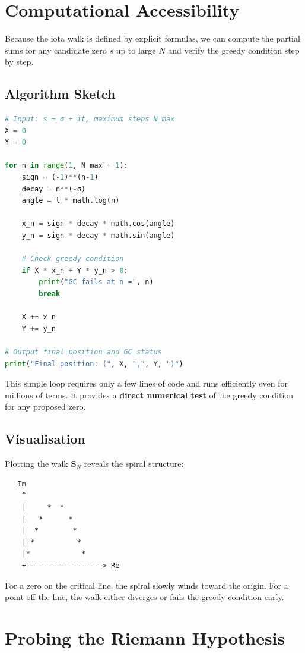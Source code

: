\documentclass[12pt,a4paper]{article}
\begin{document}
\section{Computational Accessibility}

Because the iota walk is defined by explicit formulas, we can compute the partial sums for any candidate zero \( s \) up to large \( N \) and verify the greedy condition step by step.

\subsection*{Algorithm Sketch}
\begin{lstlisting}[language=Python, caption={Verifying the Greedy Condition}]
# Input: s = σ + it, maximum steps N_max
X = 0
Y = 0

for n in range(1, N_max + 1):
    sign = (-1)**(n-1)
    decay = n**(-σ)
    angle = t * math.log(n)
    
    x_n = sign * decay * math.cos(angle)
    y_n = sign * decay * math.sin(angle)
    
    # Check greedy condition
    if X * x_n + Y * y_n > 0:
        print("GC fails at n =", n)
        break
    
    X += x_n
    Y += y_n

# Output final position and GC status
print("Final position: (", X, ",", Y, ")")
\end{lstlisting}

This simple loop requires only a few lines of code and runs efficiently even for millions of terms. It provides a \textbf{direct numerical test} of the greedy condition for any proposed zero.

\subsection*{Visualisation}
Plotting the walk \(\mathbf{S}_N\) reveals the spiral structure:

\begin{verbatim}
   Im
    ^
    |     *  *
    |   *      *
    |  *        *
    | *          *
    |*            *
    +------------------> Re
\end{verbatim}

For a zero on the critical line, the spiral slowly winds toward the origin. For a point off the line, the walk either diverges or fails the greedy condition early.

\section{Probing the Riemann Hypothesis}
\end{document}
